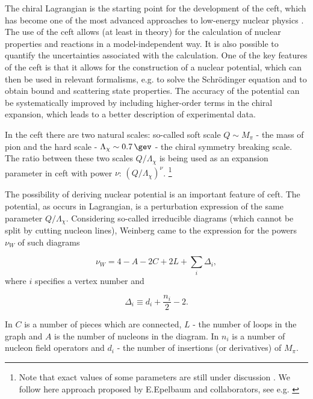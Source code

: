 The chiral Lagrangian is the starting point for the development of
the \gls{ceft}, which has become one of the
most advanced approaches to low-energy nuclear physics \cite{EpelHam2008}.
The use of the \gls{ceft} allows (at least in theory) for the calculation of nuclear properties
and reactions in a model-independent way.
It is also possible to
quantify the uncertainties associated with the calculation. One of the
key features of the \gls{ceft} is that it allows for the construction of
a nuclear potential, which can then be used in relevant formalisms, e.g. to solve the Schr\"odinger
equation and to obtain bound and scattering state properties. The accuracy of the
potential can be systematically improved by including higher-order
terms in the chiral expansion, which leads to a better description of
experimental data.

In the \gls{ceft} there are two natural scales: so-called soft scale $Q \sim M_\pi$  -
the mass of pion and the hard scale -
$\Lambda_\chi \sim \SI{0.7}{\gev}$ - the chiral symmetry breaking scale.
The ratio between these two scales $Q/\Lambda_\chi$
is being used as an expansion parameter in  \gls{ceft} with power
$\nu$: $\left(Q/\Lambda_\chi\right)^\nu$.
\footnote{Note that exact values of some parameters are still under discussion \cite{Epelbaum2004}. We follow here approach proposed by E.Epelbaum and collaborators, see e.g. \cite{reinkrebs2018}}

The possibility of deriving nuclear potential is an important feature of \gls{ceft}.
The potential, as occurs in Lagrangian, is a perturbation expression of the same parameter $Q/\Lambda_\chi$.
Considering so-called irreducible diagrams (which cannot be split
by cutting nucleon lines), Weinberg \cite{WEINBERG1990,WEINBERG1991}
came to the expression for the powers $\nu_W$ of such diagrams

\begin{equation}
    \nu_W = 4 - A - 2C + 2L + \sum_i \Delta_i,
    \label{powers}
\end{equation}
where $i$ specifies a vertex number and

\begin{equation}
    \Delta_i \equiv d_i + \frac{n_i}{2} - 2.
    \label{Delta}
\end{equation}

In  $C$ is a number of pieces which are connected, $L$ - the number of loops in the graph
and $A$ is the number of nucleons in the diagram.
In  $n_i$ is a number of nucleon field operators and $d_i$ - the number of insertions
(or derivatives) of  $M_\pi$.

